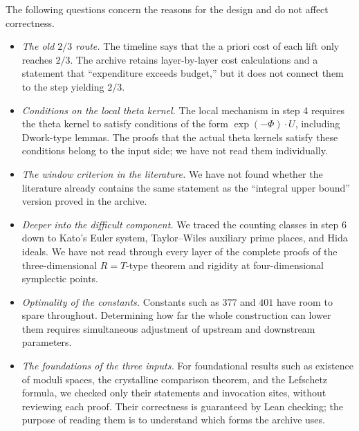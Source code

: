 \documentclass[11pt]{article}
\begin{document}
The following questions concern the reasons for the design and do not affect correctness.
\begin{itemize}
\item \emph{The old $2/3$ route.} The timeline says that the a priori cost of each lift only reaches $2/3$. The archive retains layer-by-layer cost calculations and a statement that ``expenditure exceeds budget,'' but it does not connect them to the step yielding $2/3$.
\item \emph{Conditions on the local theta kernel.} The local mechanism in step 4 requires the theta kernel to satisfy conditions of the form $\exp(-\Phi)\cdot U$, including Dwork-type lemmas. The proofs that the actual theta kernels satisfy these conditions belong to the input side; we have not read them individually.
\item \emph{The window criterion in the literature.} We have not found whether the literature already contains the same statement as the ``integral upper bound'' version proved in the archive.
\item \emph{Deeper into the difficult component.} We traced the counting classes in step 6 down to Kato's Euler system, Taylor--Wiles auxiliary prime places, and Hida ideals. We have not read through every layer of the complete proofs of the three-dimensional $R=T$-type theorem and rigidity at four-dimensional symplectic points.
\item \emph{Optimality of the constants.} Constants such as $377$ and $401$ have room to spare throughout. Determining how far the whole construction can lower them requires simultaneous adjustment of upstream and downstream parameters.
\item \emph{The foundations of the three inputs.} For foundational results such as existence of moduli spaces, the crystalline comparison theorem, and the Lefschetz formula, we checked only their statements and invocation sites, without reviewing each proof. Their correctness is guaranteed by Lean checking; the purpose of reading them is to understand which forms the archive uses.
\end{itemize}


\end{document}
